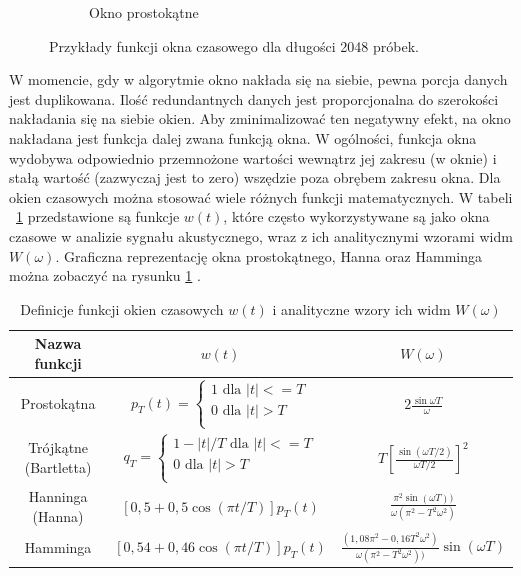 \documentclass[12pt,a4paper,twoside]{mwart}
\begin{document}
\begin{figure}[t]
\begin{subfigure}{0.49\textwidth}
    \caption{Okno prostokątne}
  \end{subfigure}
  \caption{Przykłady funkcji okna czasowego dla długości 2048 próbek.}
  \label{fig:WindowFunctions}
\end{figure}


W momencie, gdy w algorytmie okno nakłada się na siebie, pewna porcja danych jest duplikowana. Ilość redundantnych danych jest proporcjonalna do szerokości nakładania się na siebie okien. Aby zminimalizować ten negatywny efekt, na okno nakładana jest funkcja dalej zwana funkcją okna. W ogólności, funkcja okna wydobywa odpowiednio przemnożone wartości wewnątrz jej zakresu (w oknie) i stałą wartość (zazwyczaj jest to zero) wszędzie poza obrębem zakresu okna. Dla okien czasowych można stosować wiele różnych funkcji matematycznych. W tabeli ~\ref{tab:definicjeOkien} przedstawione są funkcje $w(t)$, które często wykorzystywane są jako okna czasowe w analizie sygnału akustycznego, wraz z ich analitycznymi wzorami widm $W(\omega)$. Graficzna reprezentację okna prostokątnego, Hanna oraz Hamminga można zobaczyć na rysunku \ref{fig:WindowFunctions}
\cite[87-90]{CyfrowePrzetwarzanieSygnalowOdTeoriiDoZastosowan}
\cite{Transcription:Kunieda:Aclos}.

\begin{table}[H]
  \begin{center}
    \begin{tabular}{ |c|c|c| } 
    \hline
    Nazwa funkcji & $w(t)$ & $W(\omega)$\\
    \hline
    Prostokątna & $p_T (t) = \left\{
      \begin{array}{ll}
        1 \text{ dla } |t| <= T\\
        0 \text{ dla } |t| > T\\
      \end{array}
    \right.  $ & $2\frac{\sin \omega T}{\omega}$\\
    \hline
    Trójkątne (Bartletta) & $q_T = \left\{
      \begin{array}{ll}
        1-|t|/T \text{ dla } |t| <= T\\
        0 \text{ dla } |t| > T\\
      \end{array}
    \right. $ & $T[\frac{\sin(\omega T / 2)}{\omega T/2}]^2$\\
    \hline
    Hanninga (Hanna) & $[0,5 + 0,5 \cos(\pi t / T)]p_T (t)$ & 
    $\frac{\pi^2 \sin(\omega T))}{\omega(\pi^2 - T^2 \omega^2)}$\\
    \hline
    Hamminga & $[0,54 + 0,46\cos(\pi t/T)]p_T (t)$ & 
    $\frac{(1,08\pi^2 - 0,16T^2\omega^2)}{\omega(\pi^2 - T^2 \omega^2))}\sin(\omega T)$\\
    \hline
    \end{tabular}
  \end{center}
  \caption{Definicje funkcji okien czasowych $w(t)$ i analityczne wzory ich widm $W(\omega)$}
  \label{tab:definicjeOkien}
\end{table}
\end{document}
